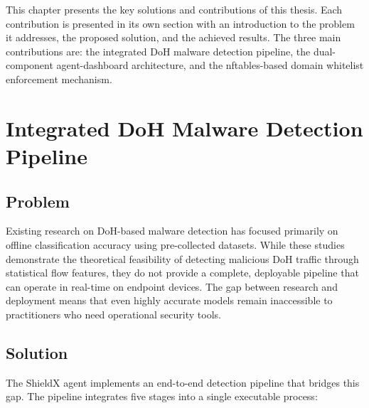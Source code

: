 \documentclass[../Main.tex]{subfiles}
\begin{document}
This chapter presents the key solutions and contributions of this thesis. Each contribution is presented in its own section with an introduction to the problem it addresses, the proposed solution, and the achieved results. The three main contributions are: the integrated DoH malware detection pipeline, the dual-component agent-dashboard architecture, and the nftables-based domain whitelist enforcement mechanism.

\section{Integrated DoH Malware Detection Pipeline}

\subsection{Problem}

Existing research on DoH-based malware detection has focused primarily on offline classification accuracy using pre-collected datasets. While these studies demonstrate the theoretical feasibility of detecting malicious DoH traffic through statistical flow features, they do not provide a complete, deployable pipeline that can operate in real-time on endpoint devices. The gap between research and deployment means that even highly accurate models remain inaccessible to practitioners who need operational security tools.

\subsection{Solution}

The ShieldX agent implements an end-to-end detection pipeline that bridges this gap. The pipeline integrates five stages into a single executable process:
\end{document}

